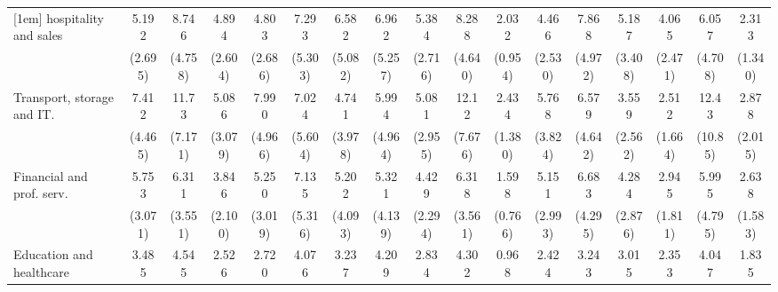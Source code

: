 {\begin{tabular}{l*{16}{c}}
[1em]
hospitality and sales&       5.192\sym{**} &       8.746\sym{***}&       4.894\sym{**} &       4.803\sym{**} &       7.293\sym{**} &       6.582\sym{*}  &       6.962\sym{*}  &       5.384\sym{***}&       8.288\sym{***}&       2.032         &       4.466\sym{**} &       7.868\sym{**} &       5.187\sym{*}  &       4.065\sym{*}  &       6.057\sym{*}  &       2.313         \\
                    &     (2.695)         &     (4.758)         &     (2.604)         &     (2.686)         &     (5.303)         &     (5.082)         &     (5.257)         &     (2.716)         &     (4.640)         &     (0.954)         &     (2.530)         &     (4.972)         &     (3.408)         &     (2.471)         &     (4.708)         &     (1.340)         \\
[1em]
Transport, storage and IT.&       7.412\sym{***}&       11.73\sym{***}&       5.086\sym{**} &       7.990\sym{***}&       7.024\sym{*}  &       4.741         &       5.994\sym{*}  &       5.081\sym{**} &       12.12\sym{***}&       2.434         &       5.768\sym{**} &       6.579\sym{**} &       3.559         &       2.512         &       12.43\sym{**} &       2.878         \\
                    &     (4.465)         &     (7.171)         &     (3.079)         &     (4.966)         &     (5.604)         &     (3.978)         &     (4.964)         &     (2.955)         &     (7.676)         &     (1.380)         &     (3.824)         &     (4.642)         &     (2.562)         &     (1.664)         &     (10.85)         &     (2.015)         \\
[1em]
Financial and prof. serv.&       5.753\sym{**} &       6.311\sym{**} &       3.846\sym{*}  &       5.250\sym{**} &       7.135\sym{**} &       5.202\sym{*}  &       5.321\sym{*}  &       4.429\sym{**} &       6.318\sym{**} &       1.598         &       5.151\sym{**} &       6.683\sym{**} &       4.284\sym{*}  &       2.945         &       5.995\sym{*}  &       2.638         \\
                    &     (3.071)         &     (3.551)         &     (2.100)         &     (3.019)         &     (5.316)         &     (4.093)         &     (4.139)         &     (2.294)         &     (3.561)         &     (0.766)         &     (2.993)         &     (4.295)         &     (2.876)         &     (1.811)         &     (4.795)         &     (1.583)         \\
[1em]
Education and healthcare&       3.485\sym{*}  &       4.545\sym{**} &       2.526         &       2.720         &       4.076         &       3.237         &       4.209         &       2.834\sym{*}  &       4.302\sym{*}  &       0.968         &       2.424         &       3.243         &       3.015         &       2.353         &       4.047         &       1.835         \\

\end{tabular}}
